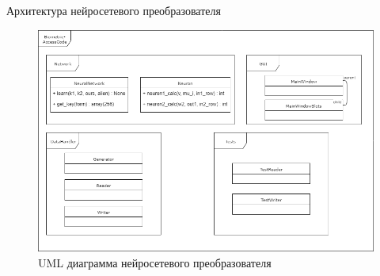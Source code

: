 \begin{frame}{Архитектура нейросетевого преобразователя}
	\begin{figure}
        \includegraphics[width=\textwidth]{img/CourseWork.png}
        \caption{UML диаграмма нейросетевого преобразователя}
    \end{figure}
\end{frame}
